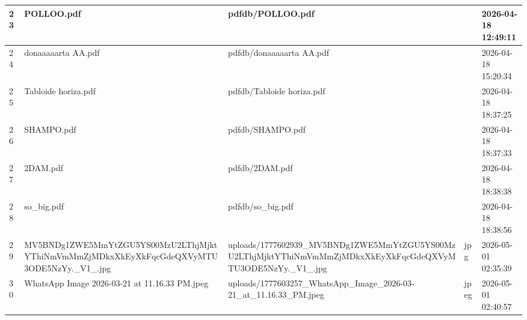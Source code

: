 \begin{longtable}{|l|l|l|l|l|}
23 & POLLOO.pdf & pdfdb/POLLOO.pdf &  & 2026-04-18 12:49:11 \\ \hline 
24 & donaaaaarta AA.pdf & pdfdb/donaaaaarta AA.pdf &  & 2026-04-18 15:20:34 \\ \hline 
25 & Tabloide horiza.pdf & pdfdb/Tabloide horiza.pdf &  & 2026-04-18 18:37:25 \\ \hline 
26 & SHAMPO.pdf & pdfdb/SHAMPO.pdf &  & 2026-04-18 18:37:33 \\ \hline 
27 & 2DAM.pdf & pdfdb/2DAM.pdf &  & 2026-04-18 18:38:38 \\ \hline 
28 & so\_big.pdf & pdfdb/so\_big.pdf &  & 2026-04-18 18:38:56 \\ \hline 
29 & MV5BNDg1ZWE5MmYtZGU5YS00MzU2LThjMjktYThiNmVmMmZjMDkxXkEyXkFqcGdeQXVyMTU3ODE5NzYy.\_V1\_.jpg & uploads/1777602939\_MV5BNDg1ZWE5MmYtZGU5YS00MzU2LThjMjktYThiNmVmMmZjMDkxXkEyXkFqcGdeQXVyMTU3ODE5NzYy.\_V1\_.jpg & jpg & 2026-05-01 02:35:39 \\ \hline 
30 & WhatsApp Image 2026-03-21 at 11.16.33 PM.jpeg & uploads/1777603257\_WhatsApp\_Image\_2026-03-21\_at\_11.16.33\_PM.jpeg & jpeg & 2026-05-01 02:40:57 \\ \hline 
 \end{longtable}
